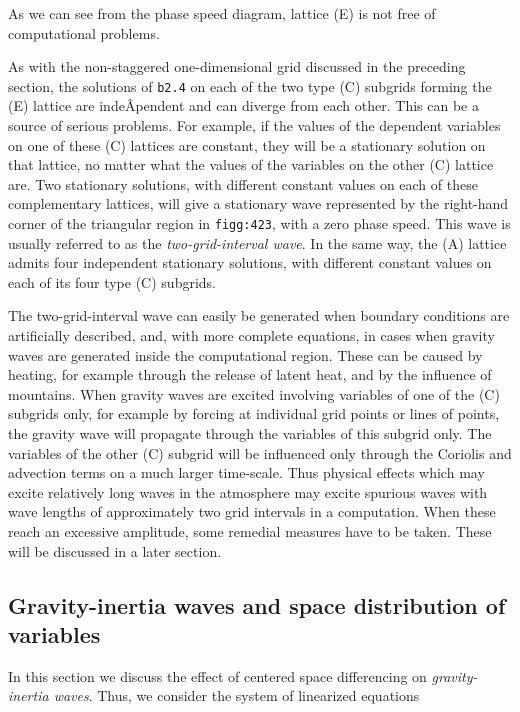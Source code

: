 As we can see from the phase speed diagram, lattice (E) is not free of
computational problems.

As with the non-staggered one-dimensional grid discussed in the
preceding section, the solutions of \texttt{b2.4} on each of the two
type (C) subgrids forming the (E) lattice are indeÂ­pendent and can
diverge from each other. This can be a source of serious problems. For
example, if the values of the dependent variables on one of these (C)
lattices are constant, they will be a stationary solution on that
lattice, no matter what the values of the variables on the other (C)
lattice are. Two stationary solutions, with different constant values on
each of these complementary lattices, will give a stationary wave
represented by the right-hand corner of the triangular region in
\texttt{figg:423}, with a zero phase speed. This wave is usually
referred to as the \emph{two-grid-interval wave}. In the same way, the
(A) lattice admits four independent stationary solutions, with different
constant values on each of its four type (C) subgrids.

The two-grid-interval wave can easily be generated when boundary
conditions are artificially described, and, with more complete
equations, in cases when gravity waves are generated inside the
computational region. These can be caused by heating, for example
through the release of latent heat, and by the influence of mountains.
When gravity waves are excited involving variables of one of the (C)
subgrids only, for example by forcing at individual grid points or lines
of points, the gravity wave will propagate through the variables of this
subgrid only. The variables of the other (C) subgrid will be influenced
only through the Coriolis and advection terms on a much larger
time-scale. Thus physical effects which may excite relatively long waves
in the atmosphere may excite spurious waves with wave lengths of
approximately two grid intervals in a computation. When these reach an
excessive amplitude, some remedial measures have to be taken. These will
be discussed in a later section.

\subsection{\texorpdfstring{\textbf{Gravity-inertia waves and space
distribution of
variables}}{Gravity-inertia waves and space distribution of variables}}\label{Section4.3}

In this section we discuss the effect of centered space differencing on
\emph{gravity-inertia waves}. Thus, we consider the system of linearized
equations

